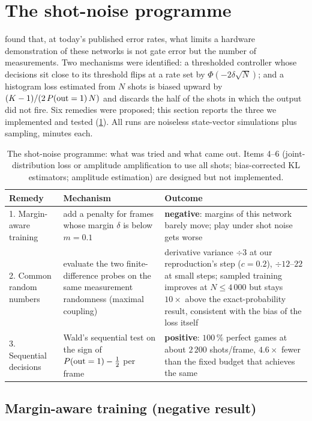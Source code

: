 \section{The shot-noise programme}
\label{sec:shots}

 found that, at today's published error rates, what limits a hardware
demonstration of these networks is not gate error but the number of measurements.  Two
mechanisms were identified: a thresholded controller whose decisions sit close to its threshold
flips at a rate set by $\Phi(-2\delta\sqrt N)$; and a histogram loss estimated from $N$ shots is
biased upward by $(K-1)/(2\,P(\mathrm{out}=1)\,N)$ and discards the half of the shots in which the output
did not fire.  Six remedies were proposed; this section reports the three we implemented and
tested (\cref{tab:shots-summary}).  All runs are noiseless state-vector simulations plus
sampling, minutes each.

\begin{table}[t]
\centering\small
\caption{The shot-noise programme: what was tried and what came out.  Items 4--6
(joint-distribution loss or amplitude amplification to use all shots; bias-corrected KL
estimators; amplitude estimation) are designed but not implemented.}
\label{tab:shots-summary}
\begin{tabularx}{\textwidth}{@{}l X X@{}}
\toprule
Remedy & Mechanism & Outcome \\
\midrule
1. Margin-aware training & add a penalty for frames whose margin $\delta$ is below $m=0.1$ &
\textbf{negative}: margins of this network barely move; play under shot noise gets worse \\
2. Common random numbers & evaluate the two finite-difference probes on the same measurement
randomness (maximal coupling) & derivative variance $\div 3$ at our reproduction's step ($c=0.2$), $\div 12$--$22$
at small steps; sampled training improves at $N\le 4\,000$ but stays $10\times$ above the
exact-probability result, consistent with the bias of the loss itself \\
3. Sequential decisions & Wald's sequential test on the sign of $P(\mathrm{out}=1)-\tfrac12$ per frame &
\textbf{positive}: $100\,\%$ perfect games at about $2\,200$ shots/frame, $4.6\times$ fewer than
the fixed budget that achieves the same \\
\bottomrule
\end{tabularx}
\end{table}

\subsection{Margin-aware training (negative result)}
\label{sec:margin}

